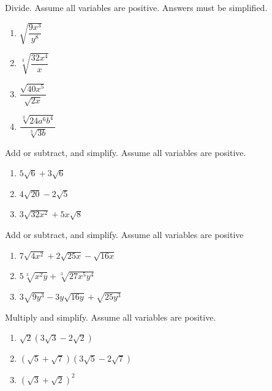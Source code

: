 \documentclass[en,11pt]{elegantbook}
\let\BeginKnitrBlock\begin \let\EndKnitrBlock\end
\begin{document}
\BeginKnitrBlock{exercise}
\protect\hypertarget{exr:unnamed-chunk-97}{}{\label{exr:unnamed-chunk-97} }
Divide. Assume all variables are positive. Answers must be simplified.

\begin{enumerate}
\def\labelenumi{\arabic{enumi}.}

\item
  \(\sqrt{\dfrac{9x^3}{y^8}}\)
\item
  \(\sqrt[3]{\dfrac{32x^4}{x}}\)
\item
  \(\dfrac{\sqrt{40x^5}}{\sqrt{2x}}\)
\item
  \(\dfrac{\sqrt[3]{24a^6b^4}}{\sqrt[3]{3b}}\)
\end{enumerate}
\EndKnitrBlock{exercise}

\BeginKnitrBlock{exercise}
\protect\hypertarget{exr:unnamed-chunk-98}{}{\label{exr:unnamed-chunk-98} }
Add or subtract, and simplify. Assume all variables are positive.

\begin{enumerate}
\def\labelenumi{\arabic{enumi}.}

\item
  \(5\sqrt6+3\sqrt6\)
\item
  \(4\sqrt{20}-2\sqrt5\)
\item
  \(3\sqrt{32x^2}+5x\sqrt{8}\)
\end{enumerate}
\EndKnitrBlock{exercise}

\BeginKnitrBlock{exercise}
\protect\hypertarget{exr:unnamed-chunk-99}{}{\label{exr:unnamed-chunk-99} }
Add or subtract, and simplify. Assume all variables are positive

\begin{enumerate}
\def\labelenumi{\arabic{enumi}.}

\item
  \(7\sqrt{4x^2}+2\sqrt{25x}-\sqrt{16x}\)
\item
  \(5\sqrt[3]{x^2y}+\sqrt[3]{27x^5y^4}\)
\item
  \(3\sqrt{9y^3}-3y\sqrt{16y}+\sqrt{25y^3}\)
\end{enumerate}
\EndKnitrBlock{exercise}

\BeginKnitrBlock{exercise}
\protect\hypertarget{exr:unnamed-chunk-100}{}{\label{exr:unnamed-chunk-100} }
Multiply and simplify. Assume all variables are positive.

\begin{enumerate}
\def\labelenumi{\arabic{enumi}.}

\item
  \(\sqrt2(3\sqrt3-2\sqrt2)\)
\item
  \((\sqrt5+\sqrt7)(3\sqrt5-2\sqrt7)\)
\item
  \((\sqrt3+\sqrt2)^2\)
\end{enumerate}
\EndKnitrBlock{exercise}
\end{document}

